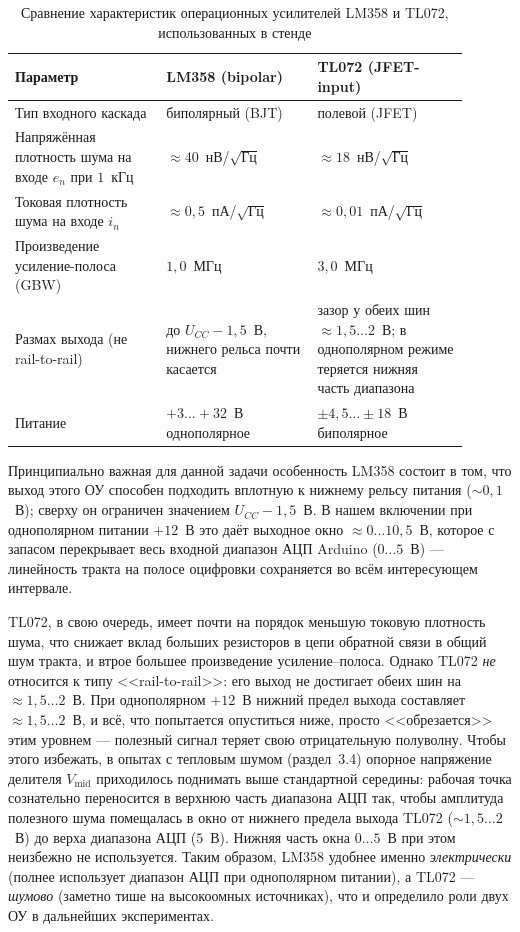\begin{table}[H]
  \centering
  \footnotesize
  \caption{Сравнение характеристик операционных усилителей LM358 и TL072, использованных в стенде}
  \label{tab:opamp_compare}
  \begin{tabular}{|p{0.30\linewidth}|p{0.30\linewidth}|p{0.30\linewidth}|}
    \hline
    Параметр & LM358 (bipolar) & TL072 (JFET-input) \\
    \hline
    Тип входного каскада & биполярный (BJT) & полевой (JFET) \\
    \hline
    Напряжённая плотность шума на входе $e_n$ при $1$~кГц & ${\approx}40$~нВ/$\sqrt{\mathrm{Гц}}$ & ${\approx}18$~нВ/$\sqrt{\mathrm{Гц}}$ \\
    \hline
    Токовая плотность шума на входе $i_n$ & ${\approx}0{,}5$~пА/$\sqrt{\mathrm{Гц}}$ & ${\approx}0{,}01$~пА/$\sqrt{\mathrm{Гц}}$ \\
    \hline
    Произведение усиление-полоса (GBW) & $1{,}0$~МГц & $3{,}0$~МГц \\
    \hline
    Размах выхода (не rail-to-rail) & до $U_{CC}-1{,}5$~В, нижнего рельса почти касается & зазор у обеих шин ${\approx}1{,}5\ldots2$~В; в однополярном режиме теряется нижняя часть диапазона \\
    \hline
    Питание & $+3{\ldots}+32$~В однополярное & $\pm 4{,}5{\ldots}\pm 18$~В биполярное \\
    \hline
  \end{tabular}
\end{table}

Принципиально важная для данной задачи особенность LM358 состоит в том, что
выход этого ОУ способен подходить вплотную к нижнему рельсу питания
(${\sim} 0{,}1$~В); сверху он ограничен значением $U_{CC}-1{,}5$~В. В нашем
включении при однополярном питании $+12$~В это даёт выходное окно
${\approx}0\ldots 10{,}5$~В, которое с запасом перекрывает весь входной диапазон
АЦП Arduino ($0\ldots 5$~В) --- линейность тракта на полосе оцифровки сохраняется
во всём интересующем интервале.

TL072, в свою очередь, имеет почти на порядок меньшую токовую плотность шума, что
снижает вклад больших резисторов в цепи обратной связи в общий шум тракта, и втрое
большее произведение усиление--полоса. Однако TL072 \emph{не} относится к типу
<<rail-to-rail>>: его выход не достигает обеих шин на ${\approx}1{,}5\ldots 2$~В.
При однополярном $+12$~В нижний предел выхода составляет ${\approx}1{,}5\ldots 2$~В,
и всё, что попытается опуститься ниже, просто <<обрезается>> этим уровнем ---
полезный сигнал теряет свою отрицательную полуволну. Чтобы этого избежать, в
опытах с тепловым шумом (раздел~3.4) опорное напряжение делителя $V_\mathrm{mid}$
приходилось поднимать выше стандартной середины: рабочая точка сознательно
переносится в верхнюю часть диапазона АЦП так, чтобы амплитуда полезного шума
помещалась в окно от нижнего предела выхода TL072 ($\sim 1{,}5\ldots 2$~В) до
верха диапазона АЦП ($5$~В). Нижняя часть окна $0\ldots 5$~В при этом неизбежно
не используется. Таким образом, LM358 удобнее именно \emph{электрически} (полнее
использует диапазон АЦП при однополярном питании), а TL072 --- \emph{шумово}
(заметно тише на высокоомных источниках), что и определило роли двух ОУ в
дальнейших экспериментах.

